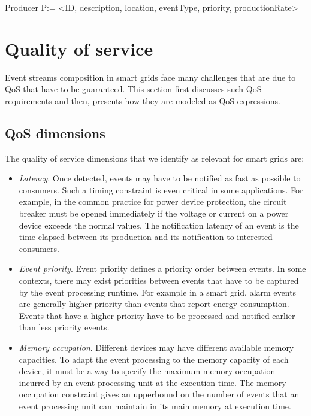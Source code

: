 Producer P:= <ID, description, location, eventType, priority, productionRate> 

\section{Quality of service}
 \label{ch4:sec-three}
 Event streams composition in smart grids face many challenges that are due to QoS that have to be guaranteed. This section first discusses such QoS requirements and then, presents how they are modeled as QoS expressions.              
\subsection{QoS dimensions}
The quality of service dimensions that we identify as relevant for smart grids are:
\begin{itemize}
 \item \textit{Latency}. Once detected, events may have to be notified as fast as possible to consumers. Such a timing constraint is even critical in some applications. For example, in the common practice for power device protection, the circuit breaker must be opened immediately if the voltage or current on a power device exceeds the normal values. The notification latency of an event is the time elapsed between its production and its notification to interested consumers.
 \item \textit{Event priority}. Event priority defines a priority order between events. In some contexts, there may exist priorities between events that have to be captured by the event processing runtime. For example in a smart grid, alarm events are generally higher priority than events that report energy consumption. Events that have a higher priority have to be processed and notified earlier than less priority events.
 \item \textit{Memory occupation}. Different devices may have different available memory capacities. To adapt the event processing to the memory capacity of each device, it must be a way to specify the maximum memory occupation incurred by an event processing unit at the execution time. The memory occupation constraint gives an upperbound on the number of events that an event processing unit can maintain in its main memory at execution time.
\end{itemize}

